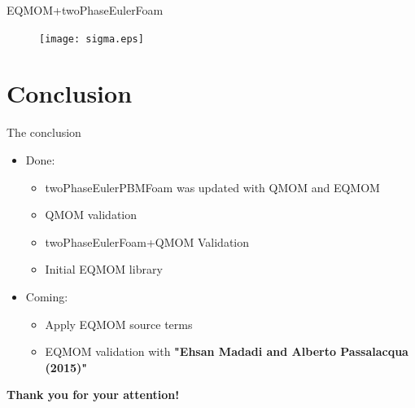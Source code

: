 \documentclass{beamer}
\begin{document}


\begin{frame}{EQMOM+twoPhaseEulerFoam}

   \begin{figure}[H]
     \texttt{[image: sigma.eps]} 
     
\end{figure}
   
\end{frame}



\section{Conclusion}

\begin{frame}{The conclusion}

\begin{itemize}
\item Done:


\begin{itemize}
\item twoPhaseEulerPBMFoam was updated with QMOM and EQMOM
\item QMOM validation
\item twoPhaseEulerFoam+QMOM Validation
\item Initial EQMOM library
\end{itemize}
\end{itemize}

\begin{itemize}
\item Coming:


\begin{itemize}
\item Apply EQMOM source terms
\item EQMOM validation with \textbf{"Ehsan Madadi and Alberto Passalacqua (2015)"}
\end{itemize} 
\end{itemize}
\end{frame}



\begin{frame}

\begin{center}
\textbf{Thank you for your attention!}
\end{center}


\end{frame}
\end{document}
